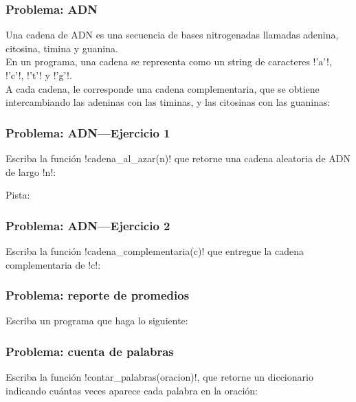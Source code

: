 \documentclass[12pt]{beamer}
\begin{document}
  \begin{frame}
    \label{problema-adn-enunciado}
    \frametitle{Problema: ADN}
    Una cadena de ADN es una secuencia
    de bases nitrogenadas llamadas
    adenina, citosina, timina y guanina. \\[2ex]

    En un programa,
    una cadena se representa como un string
    de caracteres \li!'a'!, \li!'c'!, \li!'t'! y \li!'g'!. \\[2ex]

    A cada cadena,
    le corresponde una cadena complementaria,
    que se obtiene intercambiando las adeninas con las timinas,
    y las citosinas con las guaninas:

    
  \end{frame}

  \begin{frame}
    \label{problema-adn-aleatorio}
    \frametitle{Problema: ADN---Ejercicio 1}
    Escriba la función \li!cadena_al_azar(n)!
    que retorne una cadena aleatoria de ADN
    de largo \li!n!:
    

    Pista:
    
  \end{frame}

  \begin{frame}
    \label{problema-adn-complementaria}
    \frametitle{Problema: ADN---Ejercicio 2}
    Escriba la función \li!cadena_complementaria(c)!
    que entregue la cadena complementaria de \li!c!:
    
  \end{frame}

  \begin{frame}
    \label{problema-reporte-promedios}
    \frametitle{Problema: reporte de promedios}
    Escriba un programa que haga lo siguiente:
    
  \end{frame}

  \begin{frame}
    \label{problema-cuenta-palabras}
    \frametitle{Problema: cuenta de palabras}
    Escriba la función \li!contar_palabras(oracion)!,
    que retorne un diccionario indicando cuántas veces
    aparece cada palabra en la oración:
    \footnotesize
    
  \end{frame}
\end{document}
